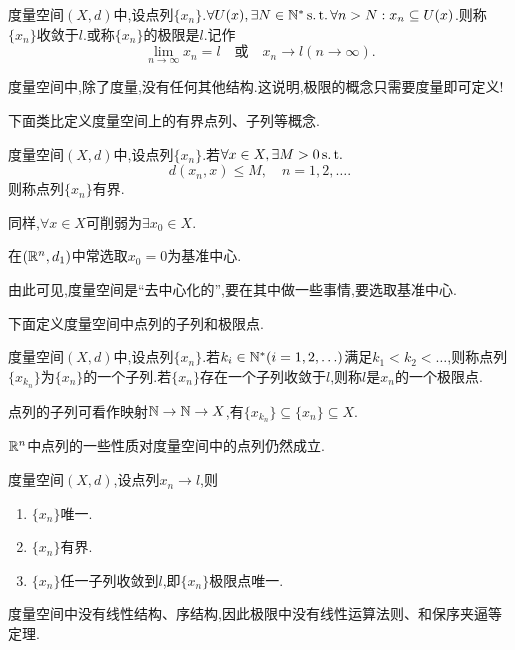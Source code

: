 \begin{definition}
    [度量空间中点列极限的邻域刻画]
    度量空间$(X,d)$中,设点列$\{x_n\}$.$\forall U(x),\exists N\in\mathbb{N}^*\operatorname{s.t.}\forall n>N:x_n\subseteq U(x)$.则称$\{x_n\}$收敛于$l$.或称$\{x_n\}$的极限是$l$.记作
    \[\lim_{n\to\infty}x_n=l\quad \textit{或}\quad x_n\to l(n\to\infty).\]
\end{definition}

\begin{remark}
    度量空间中,除了度量,没有任何其他结构.这说明,极限的概念只需要度量即可定义!
\end{remark}

下面类比定义度量空间上的有界点列、子列等概念.

\begin{definition}
    [有界点列]
    度量空间$(X,d)$中,设点列$\{x_n\}$.若$\forall x\in X,\exists M>0\operatorname{s.t.}$
    \[d(x_n,x)\leqslant M,\quad n=1,2,\dots.\]
    则称点列$\{x_n\}$有界.
\end{definition}

\begin{remark}
    同样,$\forall x\in X$可削弱为$\exists x_0\in X$.
\end{remark}

\begin{remark}
    在$(\mathbb{R}^n,d_1)$中常选取$x_0=0$为基准中心.
\end{remark}

\begin{note}
    由此可见,度量空间是“去中心化的”,要在其中做一些事情,要选取基准中心.
\end{note}

下面定义度量空间中点列的子列和极限点.

\begin{definition}
    [子列和极限点]
    度量空间$(X,d)$中,设点列$\{x_n\}$.若$k_i\in\mathbb{N}^*(i=1,2,\ldots)$满足$k_1<k_2<\ldots$,则称点列$\{x_{k_n}\}$为$\{x_n\}$的一个子列.若$\{x_n\}$存在一个子列收敛于$l$,则称$l$是$x_n$的一个极限点.
\end{definition}

\begin{remark}
    点列的子列可看作映射$\mathbb{N}\to\mathbb{N}\to X$,有$\{x_{k_n}\}\subseteq \{x_n\}\subseteq X$.
\end{remark}

$\mathbb{R}^n$中点列的一些性质对度量空间中的点列仍然成立.

\begin{proposition}
    [点列极限的性质]
    度量空间$(X,d)$,设点列$x_n\to l$,则
    \begin{enumerate}
        \item $\{x_n\}$唯一.
        \item $\{x_n\}$有界.
        \item $\{x_n\}$任一子列收敛到$l$,即$\{x_n\}$极限点唯一.
    \end{enumerate}
\end{proposition}

\begin{remark}
    度量空间中没有线性结构、序结构,因此极限中没有线性运算法则、和保序夹逼等定理.
\end{remark}